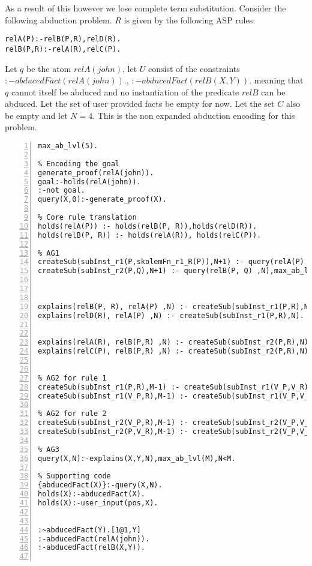 As a result of this however we lose complete term substitution. Consider the following abduction problem. $R$ is given by the following ASP rules:
\begin{lstlisting}[frame=none]
relA(P):-relB(P,R),relD(R).
relB(P,R):-relA(R),relC(P).
\end{lstlisting}
Let $q$ be the atom $relA(john)$, let $U$ consist of the constraints $:-abducedFact(relA(john)).$, $:-abducedFact(relB(X,Y)).$ meaning that $q$ cannot itself be abduced and no instantiation of the predicate $relB$ can be abduced. Let the set of user provided facts be empty for now. Let the set $C$ also be empty and let $N = 4$. This is the non expanded abduction encoding for this problem. 
\begin{lstlisting}[numbers=left]
max_ab_lvl(5).

% Encoding the goal
generate_proof(relA(john)).
goal:-holds(relA(john)).
:-not goal.
query(X,0):-generate_proof(X).

% Core rule translation
holds(relA(P)) :- holds(relB(P, R)),holds(relD(R)).
holds(relB(P, R)) :- holds(relA(R)), holds(relC(P)).

% AG1
createSub(subInst_r1(P,skolemFn_r1_R(P)),N+1) :- query(relA(P) ,N),max_ab_lvl(M),N<M-1.
createSub(subInst_r2(P,Q),N+1) :- query(relB(P, Q) ,N),max_ab_lvl(M),N<M-1.



explains(relB(P, R), relA(P) ,N) :- createSub(subInst_r1(P,R),N).
explains(relD(R), relA(P) ,N) :- createSub(subInst_r1(P,R),N).


explains(relA(R), relB(P,R) ,N) :- createSub(subInst_r2(P,R),N).
explains(relC(P), relB(P,R) ,N) :- createSub(subInst_r2(P,R),N).


% AG2 for rule 1
createSub(subInst_r1(P,R),M-1) :- createSub(subInst_r1(V_P,V_R),N), holds(relB(P, R)),max_ab_lvl(M).
createSub(subInst_r1(V_P,R),M-1) :- createSub(subInst_r1(V_P,V_R),N), holds(relD(R)),max_ab_lvl(M).

% AG2 for rule 2
createSub(subInst_r2(V_P,R),M-1) :- createSub(subInst_r2(V_P,V_R),N), holds(relA(R)),max_ab_lvl(M).
createSub(subInst_r2(P,V_R),M-1) :- createSub(subInst_r2(V_P,V_R),N), holds(relC(P)),max_ab_lvl(M).

% AG3
query(X,N):-explains(X,Y,N),max_ab_lvl(M),N<M.

% Supporting code
{abducedFact(X)}:-query(X,N).
holds(X):-abducedFact(X).
holds(X):-user_input(pos,X).


:~abducedFact(Y).[1@1,Y]
:-abducedFact(relA(john)).
:-abducedFact(relB(X,Y)).


\end{lstlisting}
